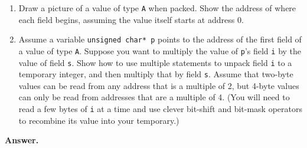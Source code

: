 \documentclass[9pt]{article}
\begin{document}
\begin{enumerate}
         \begin{enumerate}
            \item Draw a picture of a value of type \verb|A| when packed. Show
                  the address of where each field begins, assuming the value
                  itself starts at address 0.
            \item Assume a variable \verb|unsigned char* p| points to the
                  address of the first field of a value of type \verb|A|.
                  Suppose you want to multiply the value of \verb|p|'s field
                  \verb|i| by the value of field \verb|s|. Show how to use
                  multiple statements to unpack field \verb|i| to a temporary
                  integer, and then multiply that by field \verb|s|. Assume that
                  two-byte values can be read from any address that is a
                  multiple of 2, but 4-byte values can only be read from
                  addresses that are a multiple of 4. (You will need to read a
                  few bytes of \verb|i| at a time and use clever bit-shift and
                  bit-mask operators to recombine its value into your
                  temporary.)
         \end{enumerate}

      \textbf{Answer.}


\end{enumerate}
\end{document}
